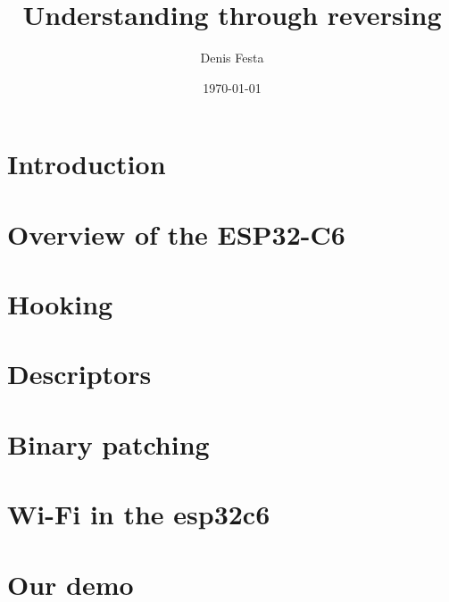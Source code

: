 \documentclass[10pt,twocolumn,a4paper]{article}
\begin{document}
\title{Understanding through reversing}
\author{Denis Festa}
\date{\today}

\maketitle

\tableofcontents

\section{Introduction}
%
%
%
%
%
%

\section{Overview of the ESP32-C6}
\label{sec:overview}


\section{Hooking}
\label{sec:hooking}


\section{Descriptors}



\section{Binary patching}



\section{Wi-Fi in the esp32c6}
\label{sec:wifiinesp32c6}


\section{Our demo}
\label{sec:demo}
\end{document}
